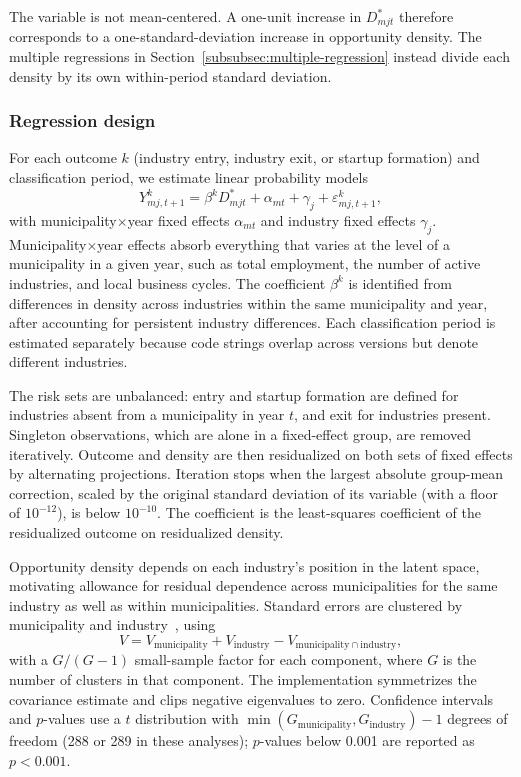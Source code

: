 \documentclass[9pt,twoside]{pnas-new}
\begin{document}
The variable is not mean-centered. A one-unit increase in \(D^{*}_{mjt}\)
therefore corresponds to a one-standard-deviation increase in opportunity
density. The multiple regressions in Section~\ref{subsubsec:multiple-regression} instead divide each density by its own within-period standard deviation.

\subsubsection{Regression design}
\label{subsubsec:regional_regression}

For each outcome $k$ (industry entry, industry exit, or startup formation) and classification period, we estimate linear probability models
\begin{equation}
Y^{k}_{mj,t+1}=\beta^{k}D^{*}_{mjt}+\alpha_{mt}+\gamma_j+\varepsilon^{k}_{mj,t+1},
\label{eq:si-regional-main}
\end{equation}
with municipality$\times$year fixed effects $\alpha_{mt}$ and industry fixed effects $\gamma_j$. Municipality$\times$year effects absorb everything that varies at the level of a municipality in a given year, such as total employment, the number of active industries, and local business cycles. The coefficient $\beta^k$ is identified from differences in density across industries within the same municipality and year, after accounting for persistent industry differences. Each classification period is estimated separately because code strings overlap across versions but denote different industries.

The risk sets are unbalanced: entry and startup formation are defined for industries absent from a municipality in year $t$, and exit for industries present. Singleton observations, which are alone in a fixed-effect group, are removed iteratively. Outcome and density are then residualized on both sets of fixed effects by alternating projections. Iteration stops when the largest absolute group-mean correction, scaled by the original standard deviation of its variable (with a floor of $10^{-12}$), is below $10^{-10}$. The coefficient is the least-squares coefficient of the residualized outcome on residualized density.

Opportunity density depends on each industry's position in the latent space, motivating allowance for residual dependence across municipalities for the same industry as well as within municipalities. Standard errors are clustered by municipality and industry~\cite{cameronRobustInferenceMultiway2011}, using
\[
V=V_{\mathrm{municipality}}+V_{\mathrm{industry}}-V_{\mathrm{municipality}\cap\mathrm{industry}},
\]
with a $G/(G-1)$ small-sample factor for each component, where $G$ is the number of clusters in that component. The implementation symmetrizes the covariance estimate and clips negative eigenvalues to zero. Confidence intervals and $p$-values use a $t$ distribution with $\min(G_{\mathrm{municipality}},G_{\mathrm{industry}})-1$ degrees of freedom (288 or 289 in these analyses); $p$-values below 0.001 are reported as $p<0.001$.
\end{document}
